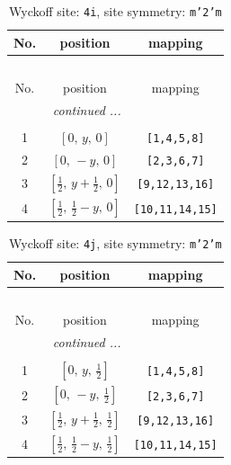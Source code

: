 \documentclass[fleqn,8pt]{jsarticle}
\begin{document}
\renewcommand{\arraystretch}{1.2}
\begin{longtable}{ccc}
\caption{Wyckoff site: {\tt 4i}, site symmetry: {\tt m'2'm}}
 \\
 \hline \hline
No. & position & mapping \\ \hline \endfirsthead

\multicolumn{2}{l}{\tablename\ \thetable{}} \\
 \hline \hline
No. & position & mapping \\ \hline \endhead

 \hline \hline
\multicolumn{2}{r}{\footnotesize\it continued ...} \\ \endfoot

 \hline \hline
\multicolumn{2}{r}{} \\ \endlastfoot

1 & $\left[ 0,\, y,\, 0 \right]$ & {\tt [1,4,5,8]} \\ \hline
2 & $\left[ 0,\, - y,\, 0 \right]$ & {\tt [2,3,6,7]} \\ \hline
3 & $\left[ \frac{1}{2},\, y + \frac{1}{2},\, 0 \right]$ & {\tt [9,12,13,16]} \\ \hline
4 & $\left[ \frac{1}{2},\, \frac{1}{2} - y,\, 0 \right]$ & {\tt [10,11,14,15]} \\
\end{longtable}
\renewcommand{\arraystretch}{1.2}
\begin{longtable}{ccc}
\caption{Wyckoff site: {\tt 4j}, site symmetry: {\tt m'2'm}}
 \\
 \hline \hline
No. & position & mapping \\ \hline \endfirsthead

\multicolumn{2}{l}{\tablename\ \thetable{}} \\
 \hline \hline
No. & position & mapping \\ \hline \endhead

 \hline \hline
\multicolumn{2}{r}{\footnotesize\it continued ...} \\ \endfoot

 \hline \hline
\multicolumn{2}{r}{} \\ \endlastfoot

1 & $\left[ 0,\, y,\, \frac{1}{2} \right]$ & {\tt [1,4,5,8]} \\ \hline
2 & $\left[ 0,\, - y,\, \frac{1}{2} \right]$ & {\tt [2,3,6,7]} \\ \hline
3 & $\left[ \frac{1}{2},\, y + \frac{1}{2},\, \frac{1}{2} \right]$ & {\tt [9,12,13,16]} \\ \hline
4 & $\left[ \frac{1}{2},\, \frac{1}{2} - y,\, \frac{1}{2} \right]$ & {\tt [10,11,14,15]} \\
\end{longtable}
\end{document}
